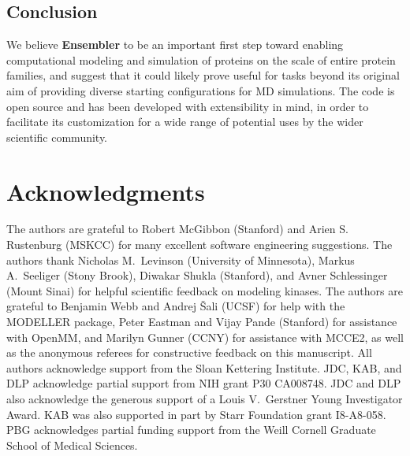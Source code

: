 \documentclass[aps,pre,twocolumn,nofootinbib,superscriptaddress,linenumbers]{revtex4-1}
\begin{document}
\subsection*{Conclusion}

We believe {\bf Ensembler} to be an important first step toward enabling computational modeling and simulation of proteins on the scale of entire protein families, and suggest that it could likely prove useful for tasks beyond its original aim of providing diverse starting configurations for MD simulations.
The code is open source and has been developed with extensibility in mind, in order to facilitate its customization for a wide range of potential uses by the wider scientific community.


\section{Acknowledgments}
\label{section:acknowledgments}

The authors are grateful to Robert McGibbon (Stanford) and Arien S. Rustenburg (MSKCC) for many excellent software engineering suggestions.
The authors thank Nicholas M.~Levinson (University of Minnesota), Markus A.~Seeliger (Stony Brook), Diwakar Shukla (Stanford), and Avner Schlessinger (Mount Sinai) for helpful scientific feedback on modeling kinases.
The authors are grateful to Benjamin Webb and Andrej \v{S}ali (UCSF) for help with the MODELLER package, Peter Eastman and Vijay Pande (Stanford) for assistance with OpenMM, and Marilyn Gunner (CCNY) for assistance with MCCE2, {\color{red} as well as the anonymous referees for constructive feedback on this manuscript.}
All authors acknowledge support from the Sloan Kettering Institute.
JDC, KAB, and DLP acknowledge partial support from NIH grant P30 CA008748.
JDC and DLP also acknowledge the generous support of a Louis V.~Gerstner Young Investigator Award.
KAB was also supported in part by Starr Foundation grant I8-A8-058.
PBG acknowledges partial funding support from the Weill Cornell Graduate School of Medical Sciences.

\end{document}
